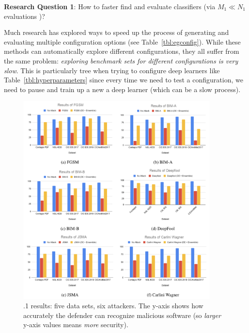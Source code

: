 \documentclass{NSF}
\newcommand{\tbl}[1]{Table~\ref{tbl:#1}}
\newcommand{\IT}{{\sffamily {\em MASS~CONFUSION}}}
\begin{document}
\begin{nsfdescription}
 \begin{blockquote}
\noindent
\textbf{Research Question 1}: 
How to faster find and evaluate classifiers (via $M_1\ll N_1$ evaluations )?
 \end{blockquote} 


Much research has explored ways to speed up the process of generating and evaluating multiple configuration options (see \tbl{egconfig}).  
While these methods can automatically explore different configurations, they all suffer from the same problem: 
{\em exploring benchmark sets for different configurations is very slow}. This is particularly tree when trying to configure deep learners like \tbl{hyperparameters} since every time we need to test a configuration, we need to pause and train up a new a deep learner (which can be a slow process).


\begin{figure}
\includegraphics[width=4in]{fig/res1.png}
\caption{{\IT}.1 results: five data sets, six attackers.
The y-axis shows how accurately the defender can recognize malicious software
(so  {\em larger} y-axis values means {\em more} security).}
\label{fig:all20}
\end{figure}


\end{nsfdescription}
\end{document}
